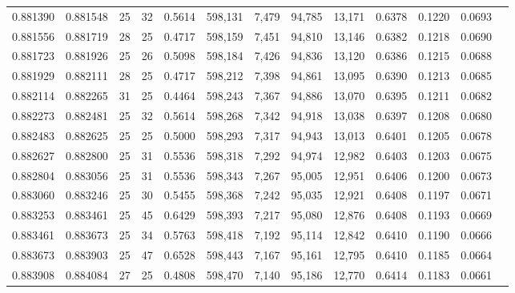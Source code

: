 \begin{tabular}{rrrrrrrrrrrrr}
0.881390 & 0.881548 &    25 &  32 &                                     0.5614 & 598,131 &   7,479 &  94,785 &  13,171 & 0.6378 & 0.1220 & 0.0693 \\
0.881556 & 0.881719 &    28 &  25 &                                     0.4717 & 598,159 &   7,451 &  94,810 &  13,146 & 0.6382 & 0.1218 & 0.0690 \\
0.881723 & 0.881926 &    25 &  26 &                                     0.5098 & 598,184 &   7,426 &  94,836 &  13,120 & 0.6386 & 0.1215 & 0.0688 \\
0.881929 & 0.882111 &    28 &  25 &                                     0.4717 & 598,212 &   7,398 &  94,861 &  13,095 & 0.6390 & 0.1213 & 0.0685 \\
0.882114 & 0.882265 &    31 &  25 &                                     0.4464 & 598,243 &   7,367 &  94,886 &  13,070 & 0.6395 & 0.1211 & 0.0682 \\
0.882273 & 0.882481 &    25 &  32 &                                     0.5614 & 598,268 &   7,342 &  94,918 &  13,038 & 0.6397 & 0.1208 & 0.0680 \\
0.882483 & 0.882625 &    25 &  25 &                                     0.5000 & 598,293 &   7,317 &  94,943 &  13,013 & 0.6401 & 0.1205 & 0.0678 \\
0.882627 & 0.882800 &    25 &  31 &                                     0.5536 & 598,318 &   7,292 &  94,974 &  12,982 & 0.6403 & 0.1203 & 0.0675 \\
0.882804 & 0.883056 &    25 &  31 &                                     0.5536 & 598,343 &   7,267 &  95,005 &  12,951 & 0.6406 & 0.1200 & 0.0673 \\
0.883060 & 0.883246 &    25 &  30 &                                     0.5455 & 598,368 &   7,242 &  95,035 &  12,921 & 0.6408 & 0.1197 & 0.0671 \\
0.883253 & 0.883461 &    25 &  45 &                                     0.6429 & 598,393 &   7,217 &  95,080 &  12,876 & 0.6408 & 0.1193 & 0.0669 \\
0.883461 & 0.883673 &    25 &  34 &                                     0.5763 & 598,418 &   7,192 &  95,114 &  12,842 & 0.6410 & 0.1190 & 0.0666 \\
0.883673 & 0.883903 &    25 &  47 &                                     0.6528 & 598,443 &   7,167 &  95,161 &  12,795 & 0.6410 & 0.1185 & 0.0664 \\
0.883908 & 0.884084 &    27 &  25 &                                     0.4808 & 598,470 &   7,140 &  95,186 &  12,770 & 0.6414 & 0.1183 & 0.0661 \\

\end{tabular}
